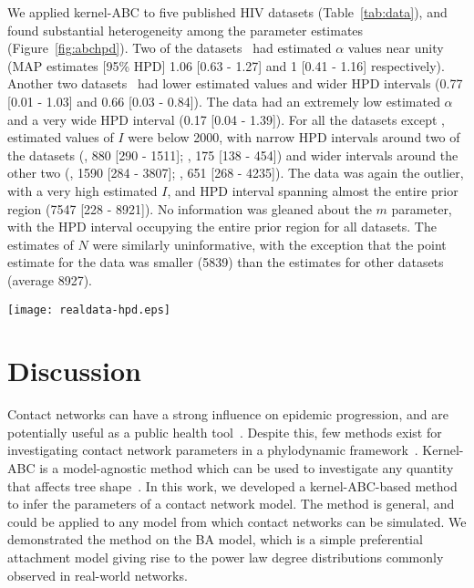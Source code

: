 \documentclass[nogrid]{MBE}
\begin{document}
We applied kernel-ABC to five published HIV datasets (Table~\ref{tab:data}),
and found substantial heterogeneity among the parameter estimates
(Figure~\ref{fig:abchpd}). Two of the datasets~\citep{niculescu2015recent,
wang2015targeting} had estimated $\alpha$ values near unity (MAP estimates
[95\% HPD] 
  1.06 
  [0.63 - 
   1.27]
and
  1 
  [0.41 -
   1.16] respectively). 
Another two datasets~\citep{li2015hiv, cuevas2009hiv} had lower estimated
values and wider HPD intervals
  (0.77 
  [0.01 - 
  1.03]
and
  0.66 
  [0.03 -
   0.84]). 
The \citet{novitsky2014impact} data had an extremely low estimated $\alpha$
and a very wide HPD interval
  (0.17 
  [0.04 -
   1.39]). 
For all the datasets except \citeauthor{novitsky2014impact}, estimated values of
$I$ were below 2000, with narrow HPD intervals around two of the
datasets
  (\citeauthor{cuevas2009hiv}, 880 
  [290 -
   1511];
   \citeauthor{niculescu2015recent}, 175
  [138 - 
   454])
and wider intervals around the other two
  (\citeauthor{li2015hiv}, 1590 
  [284 -
   3807];
   \citeauthor{wang2015targeting}, 651
  [268 - 
   4235]).
The \citeauthor{novitsky2014impact} data was again the outlier, with a very high
estimated $I$, and HPD interval spanning almost the entire prior region
  (7547 
  [228 -
   8921]).
No information was gleaned about the $m$ parameter, with the HPD interval
occupying the entire prior region for all datasets. The estimates of $N$ were
similarly uninformative, with the exception that the point estimate for the
\citeauthor{wang2015targeting} data was smaller
  (5839)
than the estimates for other datasets
 (average 8927).

\begin{figure*}[ht]
  \centering
  \texttt{[image: realdata-hpd.eps]}
  \vspace{8pt}
  \caption{
      Maximum \textit{a posteriori} point estimates and 95\% HPD intervals for
      parameters of the BA network model, fitted to five published HIV datasets
      with kernel-ABC.
  }
  \label{fig:abchpd}
\end{figure*}

\section{Discussion}

Contact networks can have a strong influence on epidemic progression, and are
potentially useful as a public health tool~\citep{wang2015targeting,
little2014using}. Despite this, few methods exist for investigating contact
network parameters in a phylodynamic framework~\citep{groendyke2011bayesian,
volz2008sir, brown2011transmission, leventhal2012inferring}. Kernel-ABC is a
model-agnostic method which can be used to investigate any quantity that
affects tree shape~\citep{poon2015phylodynamic}. In this work, we developed a
kernel-ABC-based method to infer the parameters of a contact network model. The
method is general, and could be applied to any model from which contact
networks can be simulated. We demonstrated the method on the BA model,
which is a simple preferential attachment model giving rise to the power law
degree distributions commonly observed in real-world networks. 
\end{document}

